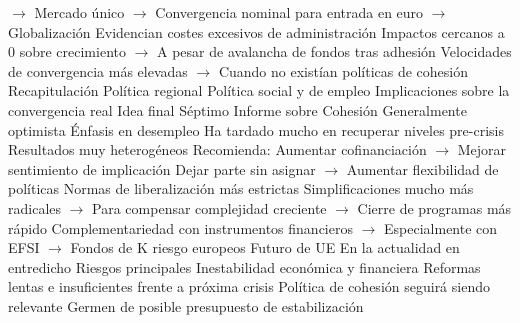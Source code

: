 \documentclass{nuevotema}
\begin{document}
\begin{esquemal}
				\4[] $\to$ Mercado único
				\4[] $\to$ Convergencia nominal para entrada en euro
				\4[] $\to$ Globalización
				\4[] Evidencian costes excesivos de administración
				\4[] Impactos cercanos a 0 sobre crecimiento
				\4[] $\to$ A pesar de avalancha de fondos tras adhesión
				\4[] Velocidades de convergencia más elevadas
				\4[] $\to$ Cuando no existían políticas de cohesión
	\1[] 
		\2 Recapitulación
			\3 Política regional
			\3 Política social y de empleo
			\3 Implicaciones sobre la convergencia real
		\2 Idea final
			\3 Séptimo Informe sobre Cohesión
				\4 Generalmente optimista
				\4 Énfasis en desempleo
				\4[] Ha tardado mucho en recuperar niveles pre-crisis
				\4[] Resultados muy heterogéneos
				\4 Recomienda:
				\4[] Aumentar cofinanciación
				\4[] $\to$ Mejorar sentimiento de implicación
				\4[] Dejar parte sin asignar
				\4[] $\to$ Aumentar flexibilidad de políticas
				\4[] Normas de liberalización más estrictas
				\4[] Simplificaciones mucho más radicales
				\4[] $\to$ Para compensar complejidad creciente
				\4[] $\to$ Cierre de programas más rápido
				\4[] Complementariedad con instrumentos financieros
				\4[] $\to$ Especialmente con EFSI
				\4[] $\to$ Fondos de K riesgo europeos
			\3 Futuro de UE
				\4 En la actualidad en entredicho
				\4 Riesgos principales
				\4[] Inestabilidad económica y financiera
				\4[] Reformas lentas e insuficientes frente a próxima crisis
				\4 Política de cohesión seguirá siendo relevante
				\4[] Germen de posible presupuesto de estabilización
\end{esquemal}































\preguntas

\end{document}
